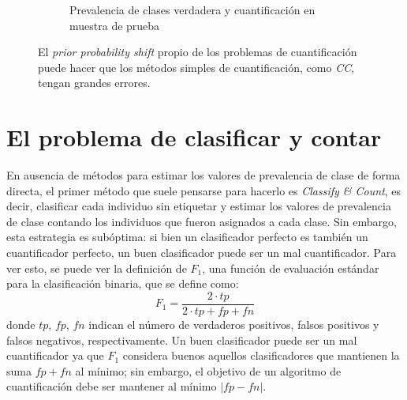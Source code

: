 \begin{figure}[h]
\begin{subfigure}[t]{0.4\textwidth}
        \caption{Prevalencia de clases verdadera y cuantificación en muestra de
        prueba}\label{cambios:cuantificacion_tst}
    \end{subfigure}
    \caption{El {\it prior probability shift\/} propio de los problemas de
    cuantificación puede hacer que los métodos simples de cuantificación, como
    {\it CC}, tengan grandes errores.}
\end{figure}

\section{El problema de clasificar y contar}\label{problema:clasificar_y_contar}

En ausencia de métodos para estimar los valores de prevalencia de clase de forma
directa, el primer método que suele pensarse para hacerlo es {\it Classify \&
Count}, es decir, clasificar cada individuo sin etiquetar y estimar los valores
de prevalencia de clase contando los individuos que fueron asignados a cada
clase. Sin embargo, esta estrategia es subóptima: si bien un clasificador
perfecto es también un cuantificador perfecto, un buen clasificador puede ser un
mal cuantificador. Para ver esto, se puede ver la definición de $F_1$, una
función de evaluación estándar para la clasificación binaria, que se define
como:
\begin{equation}
    F_1 = \frac{2 \cdot tp}{2 \cdot tp + fp + fn}
\end{equation}
donde $tp$, $fp$, $fn$ indican el número de verdaderos positivos, falsos
positivos y falsos negativos, respectivamente. Un buen clasificador puede ser un
mal cuantificador ya que $F_1$ considera buenos aquellos clasificadores que
mantienen la suma $fp + fn$ al mínimo; sin embargo, el objetivo de un algoritmo
de cuantificación debe ser mantener al mínimo $|fp-fn|$.

